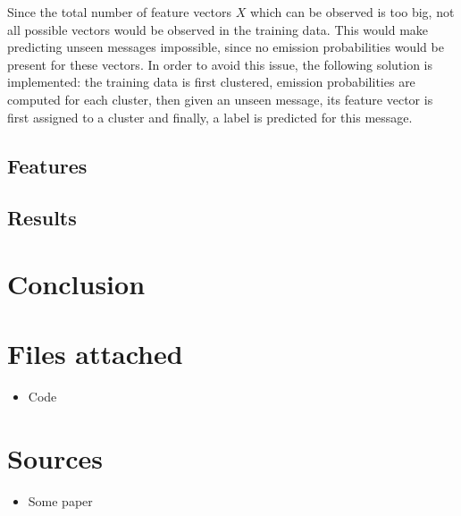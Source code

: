 \documentclass{article}
\begin{document}
\noindent Since the total number of feature vectors $X$ which can be observed is too big, not all possible vectors would be observed in the training data. This would make predicting unseen messages impossible, since no emission probabilities would be present for these vectors. In order to avoid this issue, the following solution is implemented: the training data is first clustered, emission probabilities are computed for each cluster, then given an unseen message, its feature vector is first assigned to a cluster and finally, a label is predicted for this message. \\

\noindent 


\subsection{Features}



\subsection{Results}

\pagebreak



\section{Conclusion}





\section*{Files attached}
\begin{itemize}
\item Code
\end{itemize}

\section*{Sources}

\begin{itemize}

\item Some paper
\end{itemize}
\end{document}
